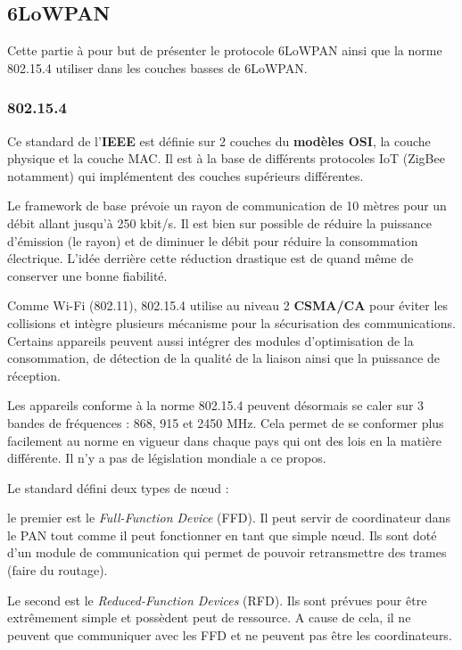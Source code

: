 
\subsection{6LoWPAN}

Cette partie à pour but de présenter le protocole 6LoWPAN ainsi que la norme 802.15.4 utiliser dans les couches basses de 6LoWPAN.

\subsubsection{802.15.4}

Ce standard de l'\textbf{IEEE} est définie sur 2 couches du \textbf{modèles OSI}, la couche physique et la couche MAC. Il est à la base de différents protocoles IoT (ZigBee notamment) qui implémentent des couches supérieurs différentes. 

Le framework de base prévoie un rayon de communication de 10 mètres pour un débit allant jusqu'à 250 kbit/s. Il est bien sur possible de réduire la puissance d'émission (le rayon) et de diminuer le débit pour réduire la consommation électrique. L'idée derrière cette réduction drastique est de quand même de conserver une bonne fiabilité.

Comme Wi-Fi (802.11), 802.15.4 utilise au niveau 2 \textbf{CSMA/CA} pour éviter les collisions et intègre plusieurs mécanisme pour la sécurisation des communications. Certains appareils peuvent aussi intégrer des modules d'optimisation de la consommation, de détection de la qualité de la liaison ainsi que la puissance de réception. 

Les appareils conforme à la norme 802.15.4 peuvent désormais se caler sur 3 bandes de fréquences :  868, 915 et 2450 MHz. Cela permet de se conformer plus facilement au norme en vigueur dans chaque pays qui ont des lois en la matière différente. Il n'y a pas de législation mondiale a ce propos.

Le standard défini deux types de nœud :

le premier est le \textit{Full-Function Device} (FFD). Il peut servir de coordinateur dans le PAN tout comme il peut fonctionner en tant que simple nœud. Ils sont doté d'un module de communication qui permet de pouvoir retransmettre des trames (faire du routage).

Le second est le \textit{Reduced-Function Devices} (RFD). Ils sont prévues pour être extrêmement simple et possèdent peut de ressource. A cause de cela, il ne peuvent que communiquer avec les FFD et ne peuvent pas être les coordinateurs.

